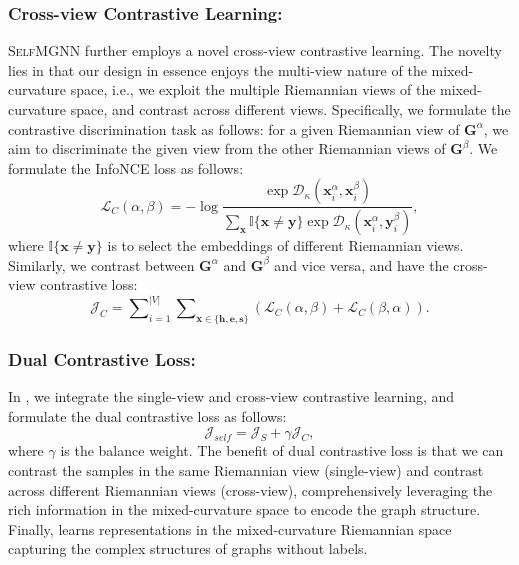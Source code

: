 \subsubsection{Cross-view Contrastive Learning:}
\textsc{SelfMGNN} further employs a novel cross-view contrastive learning.
The novelty lies in that our design in essence enjoys the multi-view nature of the mixed-curvature space, i.e., we exploit the multiple Riemannian views of the mixed-curvature space, and contrast across different views.
Specifically, we formulate the contrastive discrimination task as follows:
for a given Riemannian view of  $\mathbf G^\alpha$, we aim to discriminate the given view from the other Riemannian views of  $\mathbf G^\beta$.
We formulate the InfoNCE loss as follows:
\begin{equation}
\mathcal L_C(\alpha, \beta)=-\log \frac{\exp \mathcal D_\kappa(\mathbf x_i^\alpha, \mathbf x_i^\beta)}{\sum_{\mathbf x}\mathbb I\{\mathbf x \neq \mathbf y\} \exp \mathcal D_\kappa(\mathbf x_i^\alpha, \mathbf y_i^\beta)},
\label{geo_1}
\end{equation}
where $\mathbb I\{\mathbf x \neq \mathbf y\}$ is to select the embeddings of different Riemannian views. %
Similarly, we contrast between $\mathbf G^\alpha$ and $\mathbf G^\beta$ and vice versa, and have the cross-view contrastive loss:
\begin{equation}
\mathcal J_C = \sum\nolimits_{i=1}^{|V|}\sum\nolimits_{\mathbf x \in \{\mathbf h, \mathbf e, \mathbf s\}}\left(\mathcal L_C(\alpha, \beta)+ \mathcal L_C(\beta, \alpha)\right).
\label{geo_2}
\end{equation}

\subsubsection{Dual Contrastive Loss:} In , we integrate the single-view and cross-view contrastive learning, and formulate the dual contrastive loss as follows:
\begin{equation}
\mathcal J_{self} = \mathcal J_S + \gamma \mathcal J_C,
\end{equation}
where $\gamma$ is the balance weight. %
The benefit of dual contrastive loss is that 
we can contrast the samples in the same Riemannian view (single-view) and contrast across different Riemannian views (cross-view), %
comprehensively leveraging the rich information in the mixed-curvature space to encode the graph structure.
Finally,  learns representations in the mixed-curvature Riemannian space capturing the complex structures of graphs without labels.


